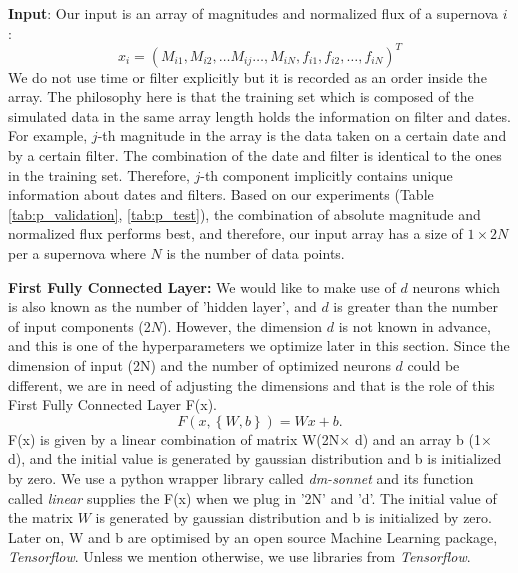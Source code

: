 \documentclass[useamsfonts]{pasj01}
\begin{document}
{\bf Input}: Our input is an array of magnitudes and normalized flux of a supernova $i$ :
\begin{equation}
      x_i = \left( M_{i1}, M_{i2}, \ldots M_{ij} \ldots , M_{iN}, f_{i1}, f_{i2}, \ldots, f_{iN} \right)^T
\end{equation}
We do not use time or filter explicitly but it is recorded as an order inside the array.  The philosophy here is that the training set which is composed of the simulated data in the same array length holds the information on filter and dates.  For example, $j$-th magnitude in the array is the data taken on a certain date and by a certain filter.  The combination of the date and filter is identical to the ones in the training set.  Therefore, $j$-th component implicitly contains unique information about dates and filters.  
Based on our experiments (Table \ref{tab:p_validation}, \ref{tab:p_test}), the combination of absolute magnitude and normalized flux performs best, and therefore, our input array has a size of $1\times2N$ per a supernova where $N$ is the number of data points.

{\bf First Fully Connected Layer:}
We would like to make use of $d$ neurons which is also known as the number of 'hidden layer', and $d$ is greater than the number of input components (2$N$).  However, the dimension $d$ is not known in advance, and this is one of the hyperparameters we optimize later in this section.  Since the dimension of input (2N) and the number of optimized neurons $d$ could be different, we are in need of adjusting the dimensions and that is the role of this First Fully Connected Layer F(x).    
\begin{equation}
    F \left(x, \left\{W,b\right\}\right) = W x + b.
\end{equation}
F(x) is given by a linear combination of matrix W(2N$\times$ d) and an array b (1$\times$ d), and the initial value is generated by gaussian distribution and b is initialized by zero.  We use a python wrapper library called {\it dm-sonnet} and its function called {\it linear} supplies the F(x) when we plug in '2N' and 'd'.  The initial value of the matrix $W$ is generated by gaussian distribution and b is initialized by zero.  Later on, W and b are optimised by an open source Machine Learning package, {\it Tensorflow}.  Unless we mention otherwise, we use libraries from {\it Tensorflow}.
\end{document}
